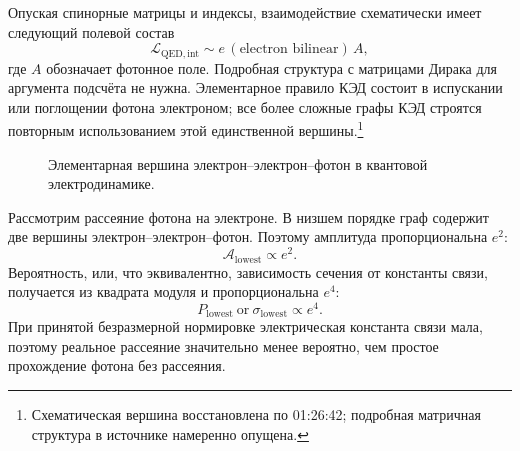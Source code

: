 Опуская спинорные матрицы и индексы, взаимодействие схематически имеет следующий полевой состав
\begin{equation}
\mathcal{L}_{\mathrm{QED,int}}
\sim e\,(\text{electron bilinear})\,A,
\end{equation}
где \(A\) обозначает фотонное поле. Подробная структура с матрицами Дирака для аргумента подсчёта не нужна. Элементарное правило КЭД состоит в испускании или поглощении фотона электроном; все более сложные графы КЭД строятся повторным использованием этой единственной вершины.\footnote{Схематическая вершина восстановлена по 01:26:42; подробная матричная структура в источнике намеренно опущена.}

\begin{figure}[htbp]
\centering
{}
\caption{Элементарная вершина электрон--электрон--фотон в квантовой электродинамике.}
\end{figure}

\begin{classroomqa}
\end{classroomqa}

\begin{classroomqa}
\end{classroomqa}

Рассмотрим рассеяние фотона на электроне. В низшем порядке граф содержит две вершины электрон--электрон--фотон. Поэтому амплитуда пропорциональна \(e^2\):
\begin{equation}
\mathcal{A}_{\mathrm{lowest}}\propto e^2.
\end{equation}
Вероятность, или, что эквивалентно, зависимость сечения от константы связи, получается из квадрата модуля и пропорциональна \(e^4\):
\begin{equation}
P_{\mathrm{lowest}}\ \text{or}\ \sigma_{\mathrm{lowest}}
\propto e^4.
\end{equation}
При принятой безразмерной нормировке электрическая константа связи мала, поэтому реальное рассеяние значительно менее вероятно, чем простое прохождение фотона без рассеяния.

